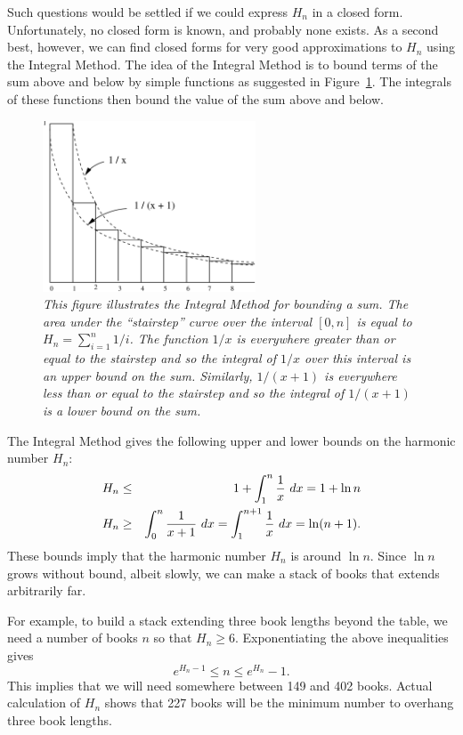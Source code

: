 Such questions would be settled if we could express $H_n$ in a closed
form.  Unfortunately, no closed form is known, and probably none exists.
As a second best, however, we can find closed forms for very good
approximations to $H_n$ using the Integral Method.  The idea of the
Integral Method is to bound terms of the sum above and below by simple
functions as suggested in Figure~\ref{fig:integral}.  The integrals of
these functions then bound the value of the sum above and below.

\begin{figure}[htbp]
\centerline{\includegraphics[height=2.0in]{figures/integral}}
\caption{\em This figure illustrates the Integral Method for bounding
a sum.  The area under the ``stairstep'' curve over the interval $[0,
n]$ is equal to $H_n = \sum_{i=1}^n 1/i$.  The function $1/x$ is
everywhere greater than or equal to the stairstep and so the integral
of $1/x$ over this interval is an upper bound on the sum.  Similarly,
$1/(x+1)$ is everywhere less than or equal to the stairstep and so the
integral of $1/(x+1)$ is a lower bound on the sum.}
\label{fig:integral}
\end{figure}

The Integral Method gives the following upper and lower bounds on the
harmonic number $H_n$:
\begin{eqnarray}
H_n & \leq & 1 + \int_1^n \frac{1}{x} \ dx = 1 + \ln n \label{Hnl}\\
H_n & \geq & \int_0^n \frac{1}{x+1} \ dx = \int_1^{n+1} \frac{1}{x} \ dx = \ln(n+1).\notag
\end{eqnarray}
These bounds imply that the harmonic number $H_n$ is around $\ln n$.
Since $\ln n$ grows without bound, albeit slowly, we can make a stack
of books that extends arbitrarily far.

For example, to build a stack extending three book lengths beyond the
table, we need a number of books $n$ so that $H_n \ge 6$.
Exponentiating the above inequalities gives
\[ %
e^{H_n - 1} \leq  n  \leq e^{H_n} - 1.
\] %
This implies that we will need somewhere between 149 and 402 books.
Actual calculation of $H_n$ shows that 227 books will be the minimum
number to overhang three book lengths.


